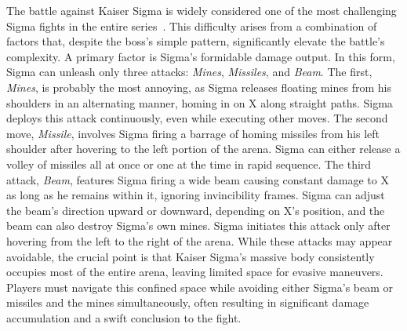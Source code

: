 The battle against Kaiser Sigma is widely considered one of the most challenging Sigma fights in the entire series~\cite{wiki:Sigma3}. This difficulty arises from a combination of factors that, despite the boss's simple pattern, significantly elevate the battle's complexity. A primary factor is Sigma's formidable damage output. In this form, Sigma can unleash only three attacks: \emph{Mines}, \emph{Missiles}, and \emph{Beam}. The first, \emph{Mines}, is probably the most annoying, as Sigma releases floating mines from his shoulders in an alternating manner, homing in on X along straight paths. Sigma deploys this attack continuously, even while executing other moves. The second move, \emph{Missile}, involves Sigma firing a barrage of homing missiles from his left shoulder after hovering to the left portion of the arena. Sigma can either release a volley of missiles all at once or one at the time in rapid sequence. The third attack, \emph{Beam}, features Sigma firing a wide beam causing constant damage to X as long as he remains within it, ignoring invincibility frames. Sigma can adjust the beam's direction upward or downward, depending on X's position, and the beam can also destroy Sigma's own mines. Sigma initiates this attack only after hovering from the left to the right of the arena. While these attacks may appear avoidable, the crucial point is that Kaiser Sigma's massive body consistently occupies most of the entire arena, leaving limited space for evasive maneuvers. Players must navigate this confined space while avoiding either Sigma's beam or missiles and the mines simultaneously, often resulting in significant damage accumulation and a swift conclusion to the fight.

